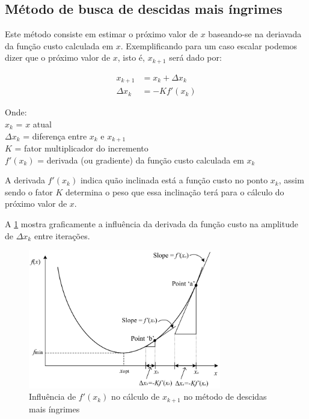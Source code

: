 \subsection{Método de busca de descidas mais íngrimes}

Este método consiste em estimar o próximo valor de $x$ baseando-se na deriavada
da função custo calculada em $x$. Exemplificando para um caso escalar podemos dizer que
o próximo valor de $x$, isto é, $x_{k+1}$ será dado por:

\begin{align}
	\label{eq:steepest_decent_xk1}
	x_{k+1} &= x_k + \Delta x_k \\ 
	\Delta x_k &= -K f'(x_k)
\end{align}

\noindent
Onde: \\
$x_k$ = $x$ atual \\
$\Delta x_k$ = diferença entre $x_k$ e $x_{k+1}$ \\
$K$ = fator multiplicador do incremento \\
$f'(x_k)$ = derivada (ou gradiente) da função custo calculada em $x_k$ \newline

A derivada $f'(x_k)$ indica quão inclinada está a função custo no ponto $x_k$,
assim sendo o fator $K$ determina o peso que essa inclinação terá para o cálculo
do próximo valor de $x$.

A \cref{fig:steepest_decent_slope} mostra graficamente a influência da derivada
da função custo na amplitude de $\Delta x_k$ entre iterações.

\begin{figure}
	\begin{center}
		\includegraphics[width=0.75\textwidth]{./5_images/fig_steepest_decent_slope.png} 
		\caption{Influência de $f'(x_k)$ no cálculo de $x_{k+1}$ no método de descidas mais íngrimes}
		\label{fig:steepest_decent_slope}
	\end{center}
\end{figure}


